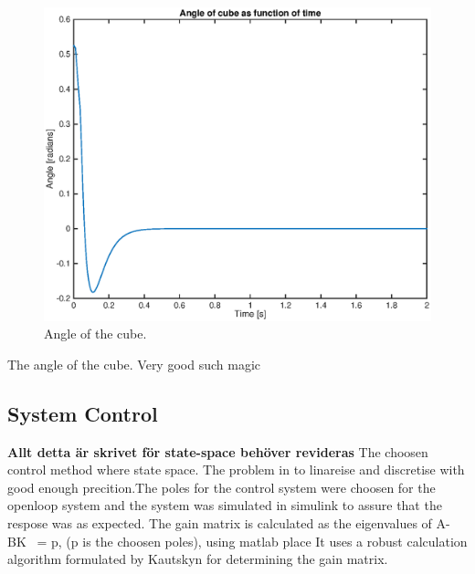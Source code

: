 \documentclass[a4paper,11pt]{kth-mag}
\begin{document}
\begin{figure}[!htb]
\centering
\includegraphics[scale=.7]{angleplot.eps}
\caption{Angle of the cube.}
\label{fig:voltageplot}
\end{figure}

The angle of the cube. Very good such magic

\subsection{System Control}
\textbf{Allt detta är skrivet för state-space behöver revideras}
The choosen control method where state space. The problem in to linareise and discretise with good enough precition.The poles for the control system were choosen for the openloop system and the system was simulated in 
	simulink to assure that the respose was as expected. 
	The gain matrix is calculated as the eigenvalues of A-BK ~= p, (p is the choosen poles), using matlab place
	It uses a robust calculation algorithm formulated by Kautskyn for determining the gain matrix.
\end{document}
